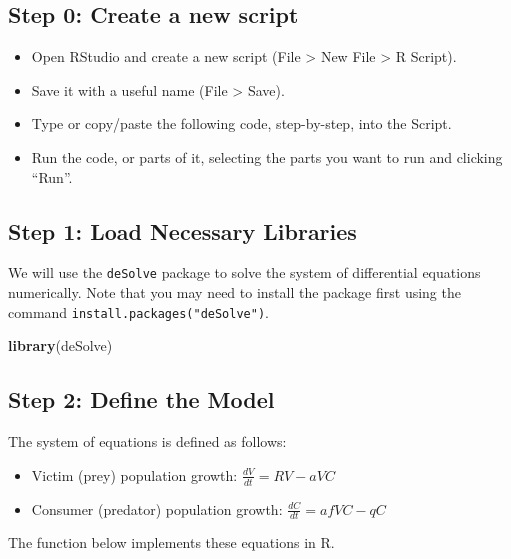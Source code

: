 \documentclass[
  a4paper]{book}
\newenvironment{Shaded}{\begin{snugshade}}{\end{snugshade}}
\newcommand{\FunctionTok}[1]{\textcolor[rgb]{0.13,0.29,0.53}{\textbf{#1}}}
\newcommand{\NormalTok}[1]{#1}
\providecommand{\tightlist}{%
  \setlength{\itemsep}{0pt}\setlength{\parskip}{0pt}}
\begin{document}
\subsection{Step 0: Create a new script}\label{step-0-create-a-new-script}

\begin{itemize}
\tightlist
\item
  Open RStudio and create a new script (File \textgreater{} New File \textgreater{} R Script).
\item
  Save it with a useful name (File \textgreater{} Save).
\item
  Type or copy/paste the following code, step-by-step, into the Script.
\item
  Run the code, or parts of it, selecting the parts you want to run and clicking ``Run''.
\end{itemize}

\subsection{Step 1: Load Necessary Libraries}\label{step-1-load-necessary-libraries}

We will use the \texttt{deSolve} package to solve the system of differential equations numerically. Note that you may need to install the package first using the command \texttt{install.packages("deSolve")}.

\begin{Shaded}
\begin{Highlighting}[]
\FunctionTok{library}\NormalTok{(deSolve)}
\end{Highlighting}
\end{Shaded}

\subsection{Step 2: Define the Model}\label{step-2-define-the-model}

The system of equations is defined as follows:

\begin{itemize}
\tightlist
\item
  Victim (prey) population growth: \(\frac{dV}{dt} = RV - aVC\)
\item
  Consumer (predator) population growth: \(\frac{dC}{dt} = afVC - qC\)
\end{itemize}

The function below implements these equations in R.
\end{document}
